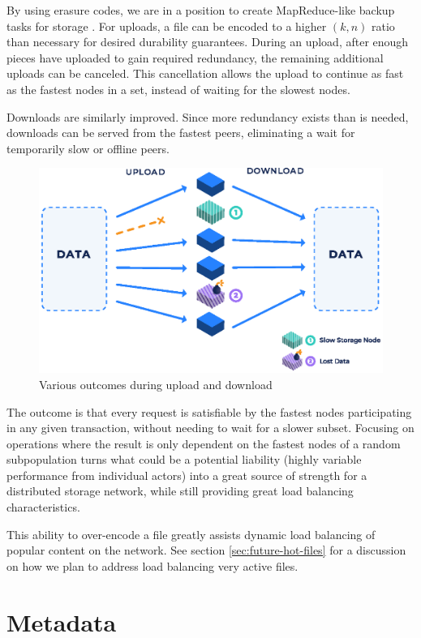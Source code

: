 \documentclass[8pt,fleqn,openany]{book}
\begin{document}
By using erasure codes, we are in a position to create MapReduce-like
backup tasks for storage \cite{rs-stragglers, rs-intro}.
For uploads, a file can be encoded to a higher $(k, n)$ ratio than
necessary for desired durability guarantees.
During an upload, after enough pieces have uploaded to gain required
redundancy, the remaining additional uploads can be canceled.
This cancellation allows the upload to continue as fast as the fastest nodes
in a set, instead of waiting for the slowest nodes.

Downloads are similarly improved. Since more redundancy exists than is needed,
downloads can be served from the fastest peers, eliminating a wait for temporarily slow or offline peers.

\begin{figure}[!htbp]
\centering
\includegraphics[height=.35\textheight]{images/redundancy.eps}
\caption{Various outcomes during upload and download}
\end{figure}

The outcome is that every request is satisfiable by the fastest nodes
participating in any given transaction, without needing to wait for a slower
subset.
Focusing on operations where the result is only dependent on the fastest
nodes of a random subpopulation turns what could be a potential liability
(highly variable performance from individual actors) into a great source of
strength for a distributed storage network, while still providing great load
balancing characteristics.

This ability to over-encode a file greatly assists dynamic load balancing of
popular content on the network. See section \ref{sec:future-hot-files} for
a discussion on how we plan to address load balancing very active files.

\section{Metadata}\label{sec:framework-metadata}
\end{document}
